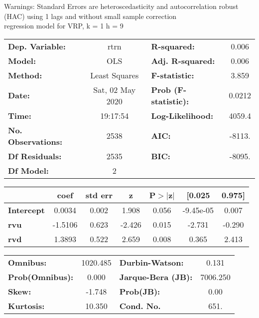 Warnings: \newline
 [1] Standard Errors are heteroscedasticity and autocorrelation robust (HAC) using 1 lags and without small sample correction\\ 

regression model for VRP, k = 1 h = 9\begin{center}
\begin{tabular}{lclc}
\toprule
\textbf{Dep. Variable:}    &       rtrn       & \textbf{  R-squared:         } &     0.006   \\
\textbf{Model:}            &       OLS        & \textbf{  Adj. R-squared:    } &     0.006   \\
\textbf{Method:}           &  Least Squares   & \textbf{  F-statistic:       } &     3.859   \\
\textbf{Date:}             & Sat, 02 May 2020 & \textbf{  Prob (F-statistic):} &   0.0212    \\
\textbf{Time:}             &     19:17:54     & \textbf{  Log-Likelihood:    } &    4059.4   \\
\textbf{No. Observations:} &        2538      & \textbf{  AIC:               } &    -8113.   \\
\textbf{Df Residuals:}     &        2535      & \textbf{  BIC:               } &    -8095.   \\
\textbf{Df Model:}         &           2      & \textbf{                     } &             \\
\bottomrule
\end{tabular}
\begin{tabular}{lcccccc}
                   & \textbf{coef} & \textbf{std err} & \textbf{z} & \textbf{P$> |$z$|$} & \textbf{[0.025} & \textbf{0.975]}  \\
\midrule
\textbf{Intercept} &       0.0034  &        0.002     &     1.908  &         0.056        &    -9.45e-05    &        0.007     \\
\textbf{rvu}       &      -1.5106  &        0.623     &    -2.426  &         0.015        &       -2.731    &       -0.290     \\
\textbf{rvd}       &       1.3893  &        0.522     &     2.659  &         0.008        &        0.365    &        2.413     \\
\bottomrule
\end{tabular}
\begin{tabular}{lclc}
\textbf{Omnibus:}       & 1020.485 & \textbf{  Durbin-Watson:     } &    0.131  \\
\textbf{Prob(Omnibus):} &   0.000  & \textbf{  Jarque-Bera (JB):  } & 7006.250  \\
\textbf{Skew:}          &  -1.748  & \textbf{  Prob(JB):          } &     0.00  \\
\textbf{Kurtosis:}      &  10.350  & \textbf{  Cond. No.          } &     651.  \\
\bottomrule
\end{tabular}
\end{center}

